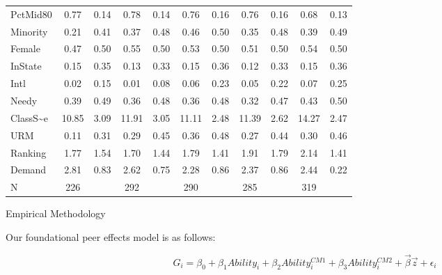 \documentclass[12pt,a4paper,english,fleqn]{article}
\makeatletter
\renewcommand\section{\@startsection{section}{1}{\z@}
{-5ex \@plus -1ex \@minus -.2ex}{2.3ex \@plus.2ex}{\normalfont\large\bf}}
\makeatother
\begin{document}
\begin{sidewaystable}
\begin{tabular}{|l|c|c|c|c|c|c|c|c|c|c|}
            PctMid80 & 0.77  & 0.14 & 0.78  & 0.14 & 0.76  & 0.16 & 0.76  & 0.16 & 0.68  & 0.13 \\
            Minority & 0.21  & 0.41 & 0.37  & 0.48 & 0.46  & 0.50 & 0.35  & 0.48 & 0.39  & 0.49 \\
            Female   & 0.47  & 0.50 & 0.55  & 0.50 & 0.53  & 0.50 & 0.51  & 0.50 & 0.54  & 0.50 \\
            InState  & 0.15  & 0.35 & 0.13  & 0.33 & 0.15  & 0.36 & 0.12  & 0.33 & 0.15  & 0.36 \\
            Intl     & 0.02  & 0.15 & 0.01  & 0.08 & 0.06  & 0.23 & 0.05  & 0.22 & 0.07  & 0.25 \\
            Needy    & 0.39  & 0.49 & 0.36  & 0.48 & 0.36  & 0.48 & 0.32  & 0.47 & 0.43  & 0.50 \\
            ClassS{\textasciitilde}e & 10.85 & 3.09 & 11.91 & 3.05 & 11.11 & 2.48 & 11.39 & 2.62 & 14.27 & 2.47 \\
            URM      & 0.11  & 0.31 & 0.29  & 0.45 & 0.36  & 0.48 & 0.27  & 0.44 & 0.30  & 0.46 \\
            Ranking  & 1.77  & 1.54 & 1.70  & 1.44 & 1.79  & 1.41 & 1.91  & 1.79 & 2.14  & 1.41 \\
            Demand   & 2.81  & 0.83 & 2.62  & 0.75 & 2.28  & 0.86 & 2.37  & 0.86 & 2.44  & 0.22 \\
\hline
N & 226 & & 292 & & 290 & & 285 & & 319\\
\hline
\hline
\end{tabular}
\end{sidewaystable}
\newpage{}
\section{Empirical Methodology}\label{methods}

Our foundational peer effects model is as follows:
\setlength{\belowdisplayskip}{6pt} \setlength{\belowdisplayshortskip}{1pt}
\setlength{\abovedisplayskip}{-4pt} \setlength{\abovedisplayshortskip}{1pt}

\begin{equation}\label{eq:0}
G_{i} = \beta_{0} + \beta_{1} Ability_{i} + \beta_{2} Ability_{i}^{CM1} + \beta_{3} Ability_{i}^{CM2} + \overrightarrow{\beta} \overrightarrow{z} + \epsilon_{i}
\end{equation}
\end{document}

